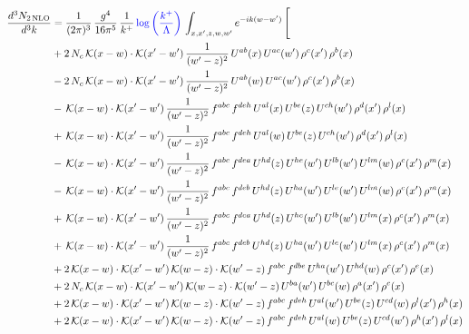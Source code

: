 \documentclass[9pt]{article}
\numberwithin{equation}{section}
\begin{document}
\begin{align}
\frac{d^{3}N_{2\,\mathrm{NLO}}}{d^{3}k} & = \frac{1}{(2\pi)^{3}}\,\frac{g^{4}}{16\pi^{5}}\,\frac{1}{k^{+}}\,{\color{blue}\log{\left(\frac{k^{+}}{\Lambda}\right)}}\,\int_{x,x',z,w,w'}e^{-ik(w-w')}\,\Bigg[
\notag \\ &+2\,N_{c}\,\mathcal{K}(x-w)\cdot\mathcal{K}(x'-w')\,\frac{1}{(w'-z)^{2}}\,U^{ab}(x)\,U^{ac}(w')\,\rho^{c}(x')\,\rho^{b}(x)\notag\\
&-2\,N_{c}\,\mathcal{K}(x-w)\cdot\mathcal{K}(x'-w')\,\frac{1}{(w'-z)^{2}}\,U^{ab}(w)\,U^{ac}(w')\,\rho^{c}(x')\,\rho^{b}(x)\notag\\
&-\,\mathcal{K}(x-w)\cdot\mathcal{K}(x'-w')\,\frac{1}{(w'-z)^{2}}\,f^{abc}\,f^{deh}\,U^{al}(x)\,U^{be}(z)\,U^{ch}(w')\,\rho^{d}(x')\,\rho^{l}(x)\notag\\
&+\,\mathcal{K}(x-w)\cdot\mathcal{K}(x'-w')\,\frac{1}{(w'-z)^{2}}\,f^{abc}\,f^{deh}\,U^{al}(w)\,U^{be}(z)\,U^{ch}(w')\,\rho^{d}(x')\,\rho^{l}(x)\notag \\ & -\,\mathcal{K}(x-w)\cdot\mathcal{K}(x'-w')\,\frac{1}{(w'-z)^{2}}\,f^{abc}\,f^{dea}\,U^{hd}(z)\,U^{he}(w')\,U^{lb}(w')\,U^{lm}(w)\,\rho^{c}(x')\,\rho^{m}(x)\notag\\
&-\,\mathcal{K}(x-w)\cdot\mathcal{K}(x'-w')\,\frac{1}{(w'-z)^{2}}\,f^{abc}\,f^{deb}\,U^{hd}(z)\,U^{ha}(w')\,U^{le}(w')\,U^{lm}(w)\,\rho^{c}(x')\,\rho^{m}(x)\notag\\
&+\,\mathcal{K}(x-w)\cdot\mathcal{K}(x'-w')\,\frac{1}{(w'-z)^{2}}\,f^{abc}\,f^{dea}\,U^{hd}(z)\,U^{he}(w')\,U^{lb}(w')\,U^{lm}(x)\,\rho^{c}(x')\,\rho^{m}(x)\notag\\
&+\,\mathcal{K}(x-w)\cdot\mathcal{K}(x'-w')\,\frac{1}{(w'-z)^{2}}\,f^{abc}\,f^{deb}\,U^{hd}(z)\,U^{ha}(w')\,U^{le}(w')\,U^{lm}(x)\,\rho^{c}(x')\,\rho^{m}(x)\notag\\
&+2\,\mathcal{K}(x-w)\cdot\mathcal{K}(x'-w')\,\mathcal{K}(w-z)\cdot\mathcal{K}(w'-z)\,f^{abc}\,f^{dbe}\,U^{ha}(w')\,U^{hd}(w)\,\rho^{c}(x')\,\rho^{e}(x)\notag\\
&+2\,N_{c}\,\mathcal{K}(x-w)\cdot\mathcal{K}(x'-w')\,\mathcal{K}(w-z)\cdot\mathcal{K}(w'-z)\,U^{ba}(w')\,U^{bc}(w)\,\rho^{a}(x')\,\rho^{c}(x)\notag \\ & +2\,\mathcal{K}(x-w)\cdot\mathcal{K}(x'-w')\,\mathcal{K}(w-z)\cdot\mathcal{K}(w'-z)\,f^{abc}\,f^{deh}\,U^{al}(w')\,U^{be}(z)\,U^{cd}(w)\,\rho^{l}(x')\,\rho^{h}(x)\notag\\
&+2\,\mathcal{K}(x-w)\cdot\mathcal{K}(x'-w')\,\mathcal{K}(w-z)\cdot\mathcal{K}(w'-z)\,f^{abc}\,f^{deh}\,U^{al}(w)\,U^{be}(z)\,U^{cd}(w')\,\rho^{h}(x')\,\rho^{l}(x)\notag\\

\end{align}
\end{document}
